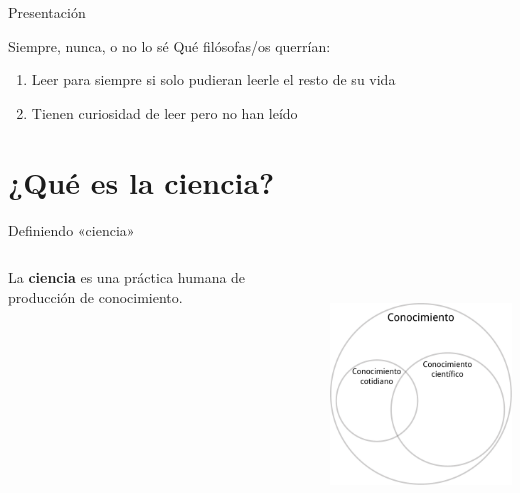 \documentclass[%
  9pt,
  spanish, %
  ignorenonframetext,
  aspectratio=169, %
]{beamer}
\providecommand{\tightlist}{}
\begin{document}
\begin{frame}{Presentación}
  \begin{block}{Siempre, nunca, o no lo sé}
    \protect{}\label{siempre-nunca-o-no-lo-suxe9}
    Qué filósofas/os querrían:

    \begin{enumerate}
        \tightlist
      \item
        Leer para siempre si solo pudieran leerle el resto de su vida
      \item
        Tienen curiosidad de leer pero no han leído
    \end{enumerate}
  \end{block}
\end{frame}

\section{¿Qué es la ciencia?}\label{quuxe9-es-la-ciencia}

\begin{frame}{Definiendo «ciencia»}
  \protect{}\label{definiendo-ciencia}
  \begin{columns}[c,onlytextwidth]
    \begin{column}{0.48\linewidth}
      La \textbf{ciencia} es una práctica humana de producción de
      conocimiento.
    \end{column}

    \begin{column}{0.48\linewidth}
      \begin{center}
        \includegraphics[height=18em]{venn.pdf}
      \end{center}
    \end{column}
  \end{columns}
\end{frame}
\end{document}
